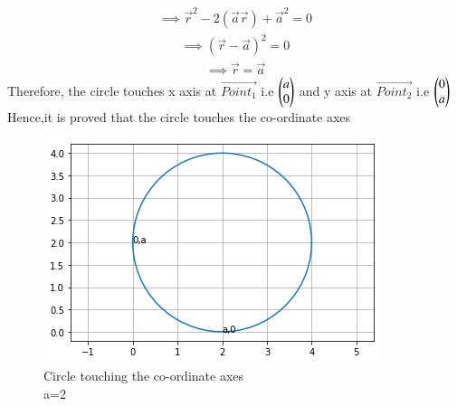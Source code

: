 \documentclass[journal,12pt,twocolumn]{IEEEtran}
\begin{document}
\begin {align}
\implies\vec{r}^2 -2\left(\vec{a}\vec{r}\right)+\vec{a}^2=0
\end{align}
\begin {align}
\implies\left(\vec{r}- \vec{a}\right)^2=0
\end{align}
\begin{align}
\implies\vec{r}= \vec{a}
\end{align}
Therefore, the circle touches x axis at $\vec{Point_{1}}$ i.e $\begin{pmatrix} a \\ 0\end{pmatrix}$ and y axis at $\vec{Point_{2}}$ i.e $\begin{pmatrix} 0\\ a\end{pmatrix}$ \\
Hence,it is proved that the circle touches the co-ordinate axes
\begin{figure}[h!]
\centering
\includegraphics[width=\columnwidth]{circle new.png}
\caption{Circle touching the co-ordinate axes \\a=2}
\end{figure}
\end{document}
